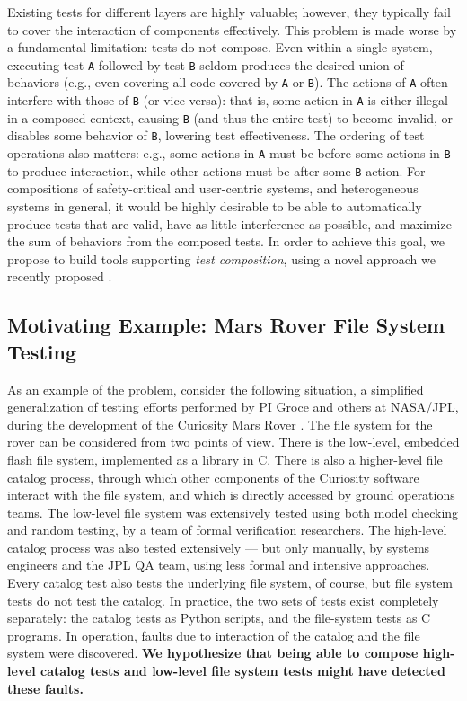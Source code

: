 Existing tests for different layers are highly valuable; however, they typically fail to cover the interaction of components effectively.  This problem is made worse by a fundamental limitation: tests do not compose.  Even within a single system, executing test {\tt A} followed by test {\tt B} seldom produces the desired union of behaviors (e.g., even covering all code covered by {\tt A} or {\tt B}).  The actions of {\tt A} often interfere with those of {\tt B} (or vice versa): that is, some action in {\tt A} is either illegal in a composed context, causing {\tt B} (and thus the entire test) to become invalid, or disables some behavior of {\tt B}, lowering test effectiveness.  The ordering of test operations also matters: e.g., some actions in {\tt A} must be before some actions in {\tt B} to produce interaction, while other actions must be after some {\tt B} action.  For compositions of safety-critical and user-centric systems, and heterogeneous systems in general, it would be highly desirable to be able to automatically produce tests that are valid, have as little interference as possible, and maximize the sum of behaviors from the composed tests.  In order to achieve this goal, we propose to build tools supporting \emph{test composition}, using a novel approach we recently proposed \cite{tecpscompose}.

\subsection{Motivating Example: Mars Rover File System Testing}

As an example of the problem, consider the following situation, a simplified generalization of testing efforts performed by PI Groce and others at NASA/JPL, during the development of the Curiosity Mars Rover \cite{AMAI}.  The file system for the rover can be considered from two points of view.  There is the low-level, embedded flash file system, implemented as a library in C.  There is also a higher-level file catalog process, through which other components of the Curiosity software interact with the file system, and which is directly accessed by ground operations teams.  The low-level file system was extensively tested using both model checking and random testing, by a team of formal verification researchers.  The high-level catalog process was also tested extensively --- but only manually, by systems engineers and the JPL QA team, using less formal and intensive approaches.  Every catalog test also tests the underlying file system, of course, but file system tests do not test the catalog.  In practice, the two sets of tests exist completely separately: the catalog tests as Python scripts, and the file-system tests as C programs.  In operation, faults due to interaction of the catalog and the file system were discovered.  \textbf{We hypothesize that being able to compose high-level catalog tests and low-level file system tests might have detected these faults.}

